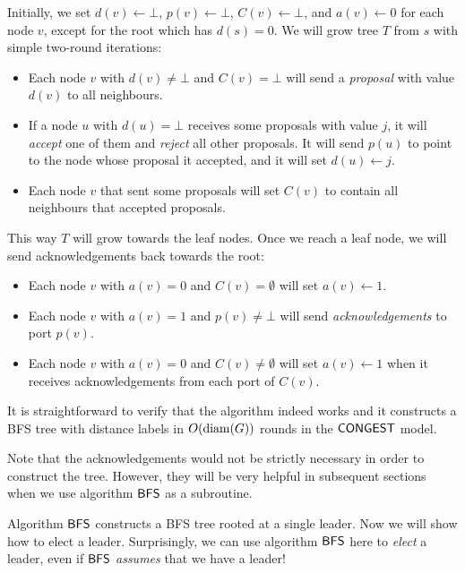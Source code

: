 Initially, we set $d(v) \gets \bot$, $p(v) \gets \bot$, $C(v) \gets \bot$, and $a(v) \gets 0$ for each node $v$, except for the root which has $d(s) = 0$. We will grow tree $T$ from $s$ with simple two-round iterations:
\begin{itemize}
    \item Each node $v$ with $d(v) \ne \bot$ and $C(v) = \bot$ will send a \emph{proposal} with value $d(v)$ to all neighbours.
    \item If a node $u$ with $d(u) = \bot$ receives some proposals with value $j$, it will \emph{accept} one of them and \emph{reject} all other proposals. It will send $p(u)$ to point to the node whose proposal it accepted, and it will set $d(u) \gets j$.
    \item Each node $v$ that sent some proposals will set $C(v)$ to contain all neighbours that accepted proposals.
\end{itemize}
This way $T$ will grow towards the leaf nodes. Once we reach a leaf node, we will send acknowledgements back towards the root:
\begin{itemize}
    \item Each node $v$ with $a(v) = 0$ and $C(v) = \emptyset$ will set $a(v) \gets 1$.
    \item Each node $v$ with $a(v) = 1$ and $p(v) \ne \bot$ will send \emph{acknowledgements} to port $p(v)$.
    \item Each node $v$ with $a(v) = 0$ and $C(v) \ne \emptyset$ will set $a(v) \gets 1$ when it receives acknowledgements from each port of $C(v)$.
\end{itemize}
It is straightforward to verify that the algorithm indeed works and it constructs a BFS tree with distance labels in $O(\operatorname{diam}(G))$ rounds in the $\textup{\sffamily CONGEST}$ model.

Note that the acknowledgements would not be strictly necessary in order to construct the tree. However, they will be very helpful in subsequent sections when we use algorithm $\textup{\sffamily BFS}$ as a subroutine.


\label{sec:leader}

Algorithm $\textup{\sffamily BFS}$ constructs a BFS tree rooted at a single leader. Now we will show how to elect a leader. Surprisingly, we can use algorithm $\textup{\sffamily BFS}$ here to \emph{elect} a leader, even if $\textup{\sffamily BFS}$ \emph{assumes} that we have a leader!

